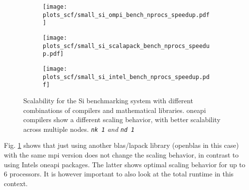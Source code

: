 \documentclass[main.tex]{subfiles}
\begin{document}
\begin{figure}[t!]
\begin{subfigure}[b]{0.49\textwidth}
    \centering
    \texttt{[image: plots\_scf/small\_si\_ompi\_bench\_nprocs\_speedup.pdf]}
\end{subfigure}
\begin{subfigure}[b]{0.49\textwidth}
    \centering
    \texttt{[image: plots\_scf/small\_si\_scalapack\_bench\_nprocs\_speedup.pdf]}
\end{subfigure}
\begin{subfigure}[b]{0.49\textwidth}
    \centering
    \texttt{[image: plots\_scf/small\_si\_intel\_bench\_nprocs\_speedup.pdf]}
\end{subfigure}
\caption{Scalability for the Si benchmarking system with different combinations of compilers and mathematical libraries. \gls{oneapi} compilers show a different scaling behavior, with better scalability across multiple nodes. \emph{\texttt{nk 1} and \texttt{nd 1}}}
\label{fig:scaling_scf_compilers_si}
\end{figure}

Fig. \ref{fig:scaling_scf_compilers_si} shows that just using another \gls{blas}/\gls{lapack} library (\gls{openblas} in this case) with the same \gls{mpi} version does not change the scaling behavior, in contrast to using Intels \gls{oneapi} packages.
The latter shows optimal scaling behavior for up to 6 processors.
It is however important to also look at the total runtime in this context.
\end{document}

